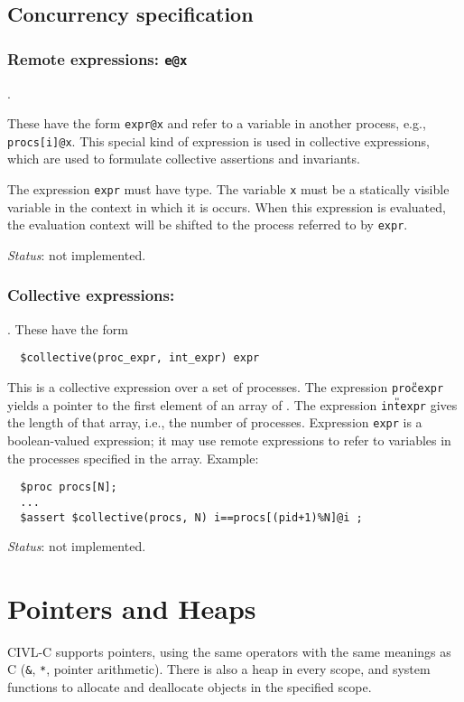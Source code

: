 \section{Concurrency specification}

\subsection{Remote expressions: \texttt{e@x}}.

These have the form \verb!expr@x! and refer to a variable in another
process, e.g., \verb!procs[i]@x!. This special kind of expression is
used in collective expressions, which are used to formulate collective
assertions and invariants.

The expression \verb!expr! must have \cproc{} type.  The variable
\texttt{x} must be a statically visible variable in the context in
which it is occurs.  When this expression is evaluated, the evaluation
context will be shifted to the process referred to by \texttt{expr}.

\emph{Status}: not implemented.

\subsection{Collective expressions: \ccollective}.  These have the form
\begin{verbatim}
  $collective(proc_expr, int_expr) expr 
\end{verbatim}
This is a collective expression over a set of processes.  The
expression \texttt{proc{\U}expr} yields a pointer to the first element
of an array of \cproc.  The expression \texttt{int{\U}expr} gives the
length of that array, i.e., the number of processes.  Expression
\texttt{expr} is a boolean-valued expression; it may use remote
expressions to refer to variables in the processes specified in the
array.  Example:
\begin{verbatim}
  $proc procs[N];
  ...
  $assert $collective(procs, N) i==procs[(pid+1)%N]@i ;
\end{verbatim}

\emph{Status}: not implemented.

\chapter{Pointers and Heaps}
\label{chap:pointers}

CIVL-C supports pointers, using the same operators with the same
meanings as C (\texttt{\&}, \texttt{*}, pointer arithmetic).  There is
also a heap in every scope, and system functions to allocate and
deallocate objects in the specified scope.

